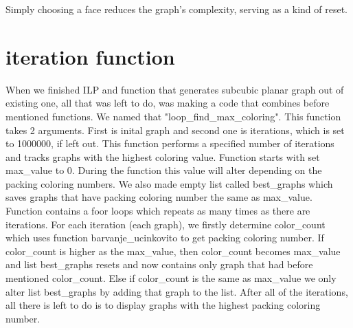 \documentclass[12pt,a4paper]{amsart}
\theoremstyle{definition}
\theoremstyle{plain}
\begin{document}
Simply choosing a face reduces the graph's complexity, serving as a kind of reset.

\section{iteration function}

When we finished ILP and function that generates subcubic planar graph out of existing one, all that was left to do, was
making a code that combines before mentioned functions. We named that "loop\_find\_max\_coloring". This function takes 
2 arguments. First is inital graph and second one is iterations, which is set to 1000000, if left out. This function
performs a specified number of iterations and tracks graphs with the highest coloring value. Function starts with set
max\_value to 0. During the function this value will alter depending on the packing coloring numbers. We also made empty 
list called best\_graphs which saves graphs that have packing coloring number the same as max\_value. Function contains
a foor loops which repeats as many times as there are iterations. For each iteration (each graph), we firstly determine
color\_count which uses function barvanje\_ucinkovito to get packing coloring number. If color\_count is higher as the
max\_value, then color\_count becomes max\_value and list best\_graphs resets and now contains only graph that had before
mentioned color\_count. Else if color\_count is the same as max\_value we only alter list best\_graphs by adding that 
graph to the list. After all of the iterations, all there is left to do is to display graphs with the highest packing
coloring number.
\end{document}
